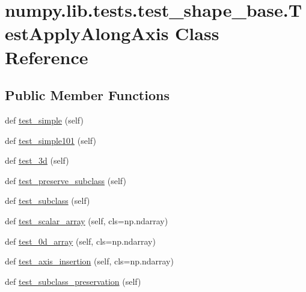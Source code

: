 \hypertarget{classnumpy_1_1lib_1_1tests_1_1test__shape__base_1_1TestApplyAlongAxis}{}\section{numpy.\+lib.\+tests.\+test\+\_\+shape\+\_\+base.\+Test\+Apply\+Along\+Axis Class Reference}
\label{classnumpy_1_1lib_1_1tests_1_1test__shape__base_1_1TestApplyAlongAxis}
\subsection*{Public Member Functions}
\begin{DoxyCompactItemize}
\item 
def \hyperlink{classnumpy_1_1lib_1_1tests_1_1test__shape__base_1_1TestApplyAlongAxis_ab48f2383cb4e8942feeaae86fdde574b}{test\+\_\+simple} (self)
\item 
def \hyperlink{classnumpy_1_1lib_1_1tests_1_1test__shape__base_1_1TestApplyAlongAxis_a87e95a7ae8f808f40a93de72d8f43cb0}{test\+\_\+simple101} (self)
\item 
def \hyperlink{classnumpy_1_1lib_1_1tests_1_1test__shape__base_1_1TestApplyAlongAxis_ac683bcb298301ded2f6c890e11d2536e}{test\+\_\+3d} (self)
\item 
def \hyperlink{classnumpy_1_1lib_1_1tests_1_1test__shape__base_1_1TestApplyAlongAxis_a32b67acb9bda371556168e35d4b80825}{test\+\_\+preserve\+\_\+subclass} (self)
\item 
def \hyperlink{classnumpy_1_1lib_1_1tests_1_1test__shape__base_1_1TestApplyAlongAxis_a9e76a485a581a5ad344c758fae279fd7}{test\+\_\+subclass} (self)
\item 
def \hyperlink{classnumpy_1_1lib_1_1tests_1_1test__shape__base_1_1TestApplyAlongAxis_a1e22f9bdddf89cf11bb17ef78531e01d}{test\+\_\+scalar\+\_\+array} (self, cls=np.\+ndarray)
\item 
def \hyperlink{classnumpy_1_1lib_1_1tests_1_1test__shape__base_1_1TestApplyAlongAxis_aaec79bb4b7e3f90d90f8f7f38a135120}{test\+\_\+0d\+\_\+array} (self, cls=np.\+ndarray)
\item 
def \hyperlink{classnumpy_1_1lib_1_1tests_1_1test__shape__base_1_1TestApplyAlongAxis_addfad0ceb858685efa692b43a71bbd67}{test\+\_\+axis\+\_\+insertion} (self, cls=np.\+ndarray)
\item 
def \hyperlink{classnumpy_1_1lib_1_1tests_1_1test__shape__base_1_1TestApplyAlongAxis_ac5894ff8dd010c3abede989a8e3ad463}{test\+\_\+subclass\+\_\+preservation} (self)

\end{DoxyCompactItemize}
